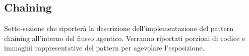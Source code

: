 \subsection{Chaining}

Sotto-sezione che riporterà la descrizione dell'implementazione del pattern chaining all'interno del flusso agentico.
Verranno riportati porzioni di codice e immagini rappresentative del pattern per agevolare l'esposizione.

